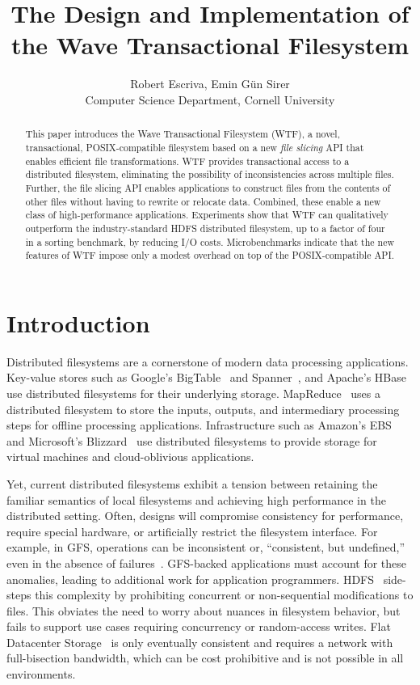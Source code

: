 \documentclass[twocolumn,10pt,letterpaper]{article}
\title{The Design and Implementation of the Wave Transactional Filesystem}
\author{\textnormal{Robert Escriva, Emin G\"un Sirer}\\
Computer Science Department, Cornell University
}
\begin{document}
\maketitle

\begin{abstract}
This paper introduces the Wave Transactional Filesystem (WTF), a novel, transactional, POSIX-compatible 
filesystem based on a new {\em file slicing} API that enables efficient file transformations.  
WTF provides transactional access to a distributed filesystem, eliminating the possibility 
of inconsistencies across multiple files. Further, the file slicing API enables applications
to construct files from the contents of other files without having to rewrite or relocate data.
Combined, these enable a new class of high-performance applications.
Experiments show that WTF can qualitatively outperform the industry-standard HDFS distributed filesystem, 
up to a factor of four in a sorting benchmark, by reducing I/O costs. 
Microbenchmarks indicate that the new features of WTF impose only a modest overhead 
on top of the POSIX-compatible API.
\end{abstract}

\section{Introduction}
\label{sec:intro}

Distributed filesystems are a cornerstone of modern data processing
applications.  Key-value stores such as Google's BigTable~\cite{bigtable} and
Spanner~\cite{spanner}, and Apache's HBase~\cite{hbase} use distributed
filesystems for their underlying storage.  MapReduce~\cite{mapreduce} uses a
distributed filesystem to store the inputs, outputs, and intermediary processing
steps for offline processing applications.  Infrastructure such as Amazon's
EBS~\cite{ebs} and Microsoft's Blizzard~\cite{blizzard} use distributed
filesystems to provide storage for virtual machines and cloud-oblivious
applications.

Yet, current distributed filesystems exhibit a tension between retaining the
familiar semantics of local filesystems and achieving high performance in the
distributed setting.  Often, designs will compromise consistency for
performance, require special hardware, or artificially restrict the filesystem
interface.  For example, in GFS, operations can be inconsistent or,
``consistent, but undefined,'' even in the absence of failures~\cite{gfs}.
GFS-backed applications must account for these anomalies, leading to additional
work for application programmers.  HDFS~\cite{hdfs} side-steps this complexity
by prohibiting concurrent or non-sequential modifications to files.  This
obviates the need to worry about nuances in filesystem behavior, but fails to
support use cases requiring concurrency or random-access writes.  Flat
Datacenter Storage~\cite{fds} is only eventually consistent and requires a
network with full-bisection bandwidth, which can be cost prohibitive and is not
possible in all environments.
\end{document}
